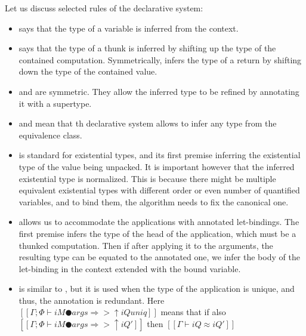 \documentclass[acmsmall,natbib=false,review,anonymous]{acmart}
\begin{document}
Let us discuss selected rules of the declarative system:
\begin{itemize}
  \item {}
    says that the type of a variable is inferred from the context.
  \item {} says
    that the type of a thunk is inferred by shifting up the type of the 
    contained computation. Symmetrically, 
    infers the type of a return by shifting down the type of the
    contained value.
  \item {} and  are symmetric.
    They allow the inferred type to be refined by annotating it with a supertype.
  \item {} and 
    mean that th declarative system allows to infer any type from the equivalence class.
  \item {} is standard for existential types,
    and its first premise inferring the existential type of the value being unpacked.
    It is important however that the inferred existential type is normalized. 
    This is because there might be multiple equivalent existential types 
    with different order or even number of quantified variables, 
    and to bind them, the algorithm needs to fix the canonical one.
  \item {} allows us to accommodate the applications
    with annotated let-bindings. The first premise infers the type of the head of the application,
    which must be a thunked computation. Then if after applying it 
    to the arguments, the resulting type can be equated to the annotated one,
    we infer the body of the let-binding in the context extended with the bound variable.
  \item {} is similar to ,
    but it is used when the type of the application is unique, and thus, the annotation
    is redundant. Here $[[Γ ; Φ ⊢ iM ● args ⇒> ↑iQ uniq]]$ means that
    if also $[[Γ ; Φ ⊢ iM ● args ⇒> ↑iQ']]$ then $[[Γ ⊢ iQ ≈ iQ']]$
\end{itemize}
\end{document}
